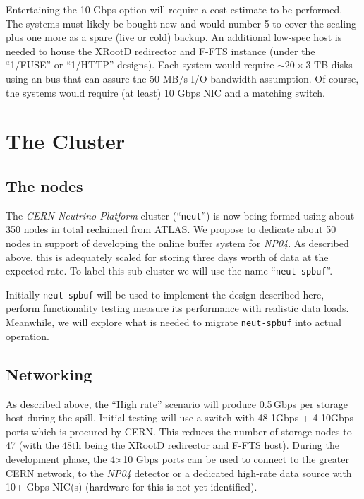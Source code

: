 \documentclass[pdftex,12pt,letter]{article}
\newcommand{\xrd}{XRootD\xspace}
\newcommand{\expname}{\textit{NP04}\xspace}
\begin{document}
Entertaining the 10 Gbps option will require a cost estimate to be
performed.  The systems must likely be bought new and would number 5
to cover the scaling plus one more as a spare (live or cold) backup.
An additional low-spec host is needed to house the \xrd redirector and
F-FTS instance (under the ``1/FUSE'' or ``1/HTTP'' designs). Each
system would require $\sim 20 \times 3$ TB disks using an bus that can
assure the 50 MB/s I/O bandwidth assumption.  Of course, the systems
would require (at least) 10 Gbps NIC and a matching switch.



\section{The Cluster}
\subsection{The nodes}

The \textit{CERN Neutrino Platform} cluster (``\texttt{neut}'') is now being formed using about 350 nodes in
total reclaimed from ATLAS.  We propose to dedicate about 50 nodes in
support of developing the online buffer system for \expname.  
As described above, this is adequately scaled for storing three days worth of
data at the expected rate. To label this sub-cluster we will use the name ``\texttt{neut-spbuf}''.

Initially \texttt{neut-spbuf} will be used to implement the design
described here, perform functionality testing measure its performance
with realistic data loads.  Meanwhile, we will explore what is needed
to migrate \texttt{neut-spbuf} into actual operation.

\subsection{Networking}

As described above, the ``High rate'' scenario will produce 0.5\,Gbps
per storage host during the spill.  Initial testing will use a switch
with 48 1Gbps + 4 10Gbps ports which is procured by CERN.  This
reduces the number of storage nodes to 47 (with the 48th being the
\xrd redirector and F-FTS host).  During the development phase, the
4$\times$10 Gbps ports can be used to connect to the greater CERN
network, to the \expname detector or a dedicated high-rate data source
with 10+ Gbps NIC(s) (hardware for this is not yet identified).
\end{document}
